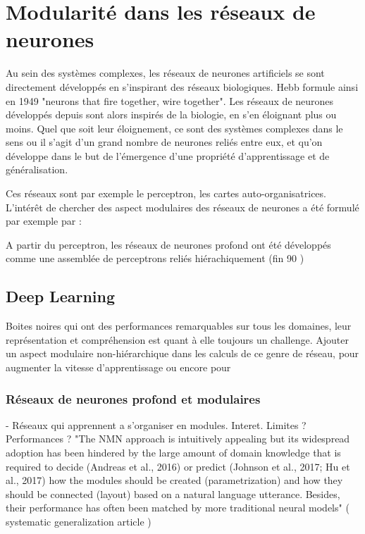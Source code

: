 \section{Modularité dans les réseaux de neurones}

Au sein des systèmes complexes, les réseaux de neurones artificiels se sont directement développés en s'inspirant des réseaux biologiques. Hebb formule ainsi en 1949 "neurons that fire together, wire together". Les réseaux de neurones développés depuis sont alors inspirés de la biologie, en s'en éloignant plus ou moins. Quel que soit leur éloignement, ce sont des systèmes complexes dans le sens ou il s'agit d'un grand nombre de neurones reliés entre eux, et qu'on développe dans le but de l'émergence d'une propriété d'apprentissage et de généralisation.

Ces réseaux sont par exemple le perceptron, les cartes auto-organisatrices. 
L'intérêt de chercher des aspect modulaires des réseaux de neurones a été formulé par exemple par \cite{towards_novel_2001} : 

A partir du perceptron, les réseaux de neurones profond ont été développés comme une assemblée de perceptrons reliés hiérachiquement (fin 90 ) 

\subsection{Deep Learning}
Boites noires qui ont des performances remarquables sur tous les domaines, leur représentation et compréhension est quant à elle toujours un challenge. Ajouter un aspect modulaire non-hiérarchique dans les calculs de ce genre de réseau, pour augmenter la vitesse d'apprentissage ou encore pour 

\subsubsection{Réseaux de neurones profond et modulaires}

- Réseaux qui apprennent a s'organiser en modules. Interet. Limites ? Performances ? \cite{Andreas2016NeuralMN,Kirsch2018ModularNL}
"The NMN approach is intuitively appealing but its
widespread adoption has been hindered by the large amount of domain knowledge that is required
to decide (Andreas et al., 2016) or predict (Johnson et al., 2017; Hu et al., 2017) how the modules
should be created (parametrization) and how they should be connected (layout) based on a natural
language utterance. Besides, their performance has often been matched by more traditional neural
models" ( systematic generalization article ) 


